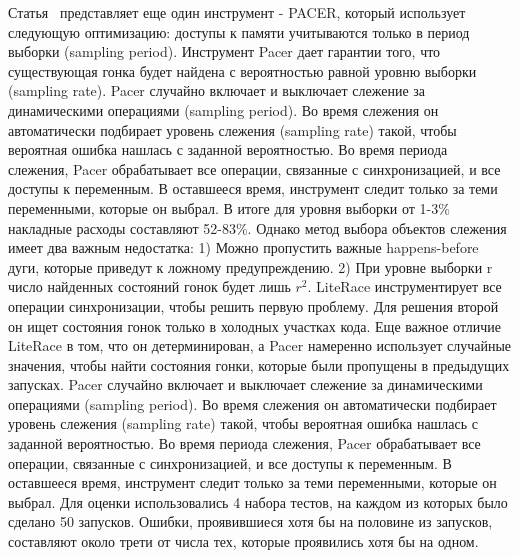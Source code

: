 Статья~\cite{Bond:2010:PLDI,Bond:2010} представляет еще один инструмент - PACER, который использует следующую оптимизацию: доступы к памяти учитываются только в период выборки (sampling period).
Инструмент Pacer дает гарантии того, что существующая гонка будет найдена с вероятностью равной уровню выборки (sampling rate). Pacer случайно включает и выключает слежение за динамическими операциями (sampling period). Во время слежения он автоматически подбирает уровень слежения (sampling rate) такой, чтобы вероятная ошибка нашлась с заданной вероятностью. Во время периода слежения, Pacer обрабатывает все операции, связанные с синхронизацией, и все доступы к переменным. В оставшееся время, инструмент следит только за теми переменными, которые он выбрал.
В итоге для уровня выборки от 1-3\% накладные расходы составляют 52-83\%.
Однако метод выбора объектов слежения имеет два важным недостатка:
1) Можно пропустить важные happens-before дуги, которые приведут к ложному предупреждению.
2) При уровне выборки r число найденных состояний гонок будет лишь $r^2$. 
LiteRace инструментирует все операции синхронизации, чтобы решить первую проблему. Для решения второй он ищет состояния гонок только в холодных участках кода. Еще важное отличие LiteRace в том, что он детерминирован, а Pacer намеренно использует случайные значения, чтобы найти состояния гонки, которые были пропущены в предыдущих запусках.
Pacer случайно включает и выключает слежение за динамическими операциями (sampling period). Во время слежения он автоматически подбирает уровень слежения (sampling rate) такой, чтобы вероятная ошибка нашлась с заданной вероятностью. Во время периода слежения, Pacer обрабатывает все операции, связанные с синхронизацией, и все доступы к переменным. В оставшееся время, инструмент следит только за теми переменными, которые он выбрал.
Для оценки использовались 4 набора тестов, на каждом из которых было сделано 50 запусков. Ошибки, проявившиеся хотя бы на половине из запусков, составляют около трети от числа тех, которые проявились хотя бы на одном.

